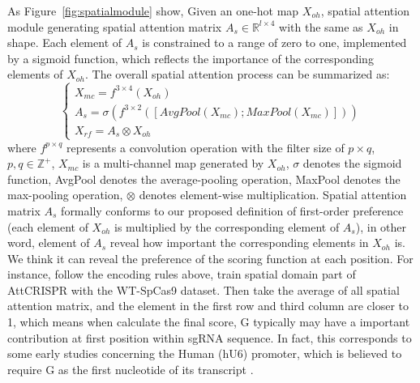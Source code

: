 \documentclass{bioinfo}
\begin{document}
As Figure~\ref{fig:spatialmodule} show, Given an one-hot map $X_{oh}$, spatial attention module generating spatial attention matrix 
$A_s\in\mathbb{R}^{l\times 4}$ with the same as $X_{oh}$ in shape. 
Each element of $A_s$ is constrained to a range of zero to one, implemented by a sigmoid function, which reflects the importance of the corresponding elements of $X_{oh}$.
The overall spatial attention process can be summarized as:
\begin{equation}
\left\{\begin{array}{l}
X_{mc} = f^{3\times4}(X_{oh})
\\A_s = \sigma(f^{3\times2}([AvgPool(X_{mc});MaxPool(X_{mc})]))
\\X_{rf} = A_s\otimes X_{oh}
\end{array}\right.\label{eq:11}
\end{equation}
where $f^{p\times q}$ represents a convolution operation with the filter size of $p\times q$, 
$p,q\in\mathbb{Z}^{+}$, $X_{mc}$ is a multi-channel map generated by $X_{oh}$, $\sigma$ denotes the sigmoid function, 
AvgPool denotes the average-pooling operation, MaxPool denotes the max-pooling operation, $\otimes$ denotes element-wise multiplication.
Spatial attention matrix $A_s$ formally conforms to our proposed definition of first-order preference (each element of $X_{oh}$ is multiplied by the corresponding element of $A_s$), 
in other word, element of $A_s$ reveal how important the corresponding elements in $X_{oh}$ is. 
We think it can reveal the preference of the scoring function at each position. 
For instance, follow the encoding rules above, train spatial domain part of AttCRISPR with the WT-SpCas9 dataset. 
Then take the average of all spatial attention matrix, and the element in the first row and third column are closer to 1, which means when calculate the final score, 
G typically may have a important contribution at first position within sgRNA sequence. 
In fact, this corresponds to some early studies concerning the Human (hU6) promoter, which is believed to require G as the first nucleotide of its transcript \citep{cong2013multiplex,jinek2012a,mali2013rnaguided}.
\end{document}

